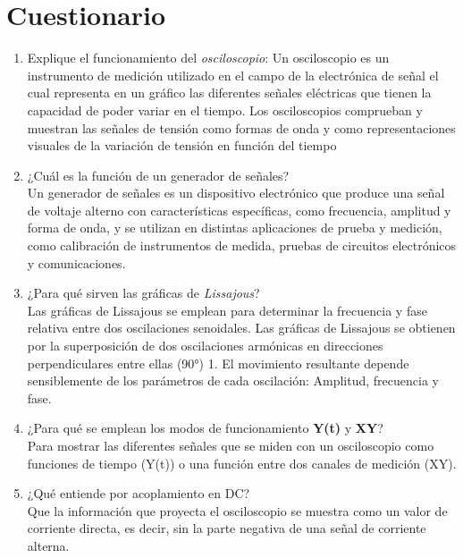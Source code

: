 \documentclass[a4paper,12pt]{article}
\begin{document}
\newpage

\section{Cuestionario}

\vspace{0.5cm}

\begin{enumerate}

	\item Explique el funcionamiento del \emph{osciloscopio}:
	Un osciloscopio es un instrumento de medición utilizado en el campo de la electrónica de señal el cual representa en un gráfico las diferentes señales eléctricas que tienen la capacidad de poder variar en el tiempo. Los osciloscopios comprueban y muestran las señales de tensión como formas de onda y como representaciones visuales de la variación de tensión en función del tiempo

	\item ¿Cuál es la función de un generador de señales? \\ Un generador de señales es un dispositivo electrónico que produce una señal de voltaje alterno con características específicas, como frecuencia, amplitud y forma de onda, y se utilizan en distintas aplicaciones de prueba y medición, como calibración de instrumentos de medida, pruebas de circuitos electrónicos y comunicaciones.
	
	\item ¿Para qué sirven las gráficas de \emph{Lissajous}? \\ Las gráficas de Lissajous se emplean para determinar la frecuencia y fase relativa entre dos oscilaciones senoidales. Las gráficas de Lissajous se obtienen por la superposición de dos oscilaciones armónicas en direcciones perpendiculares entre ellas (90°) 1. El movimiento resultante depende sensiblemente de los parámetros de cada oscilación: Amplitud, frecuencia y fase.
	
	\item ¿Para qué se emplean los modos de funcionamiento \textbf{Y(t)} y \textbf{XY}? \\ Para mostrar las diferentes señales que se miden con un osciloscopio como funciones de tiempo (Y(t)) o una función entre dos canales de medición (XY).
	
	\item ¿Qué entiende por acoplamiento en DC? \\ Que la información que proyecta el osciloscopio se muestra como un valor de corriente directa, es decir, sin la parte negativa de una señal de corriente alterna.
	

\end{enumerate}
\end{document}
